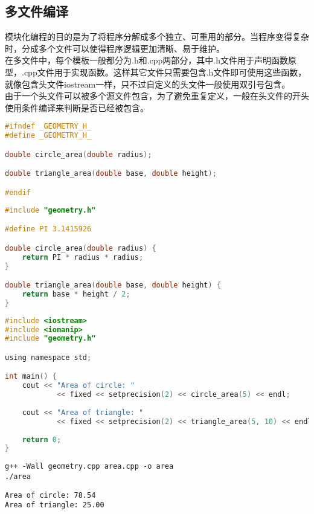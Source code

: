 \vspace{0.5cm}

\subsection{多文件编译}

模块化编程的目的是为了将程序分解成多个独立、可重用的部分。当程序变得复杂时，分成多个文件可以使得程序逻辑更加清晰、易于维护。\\

在多文件中，每个模板一般都分为.h和.cpp两部分，其中.h文件用于声明函数原型，.cpp文件用于实现函数。这样其它文件只需要包含.h文件即可使用这些函数，就像包含头文件iostream一样，只不过自定义的头文件一般使用双引号包含。\\

由于一个头文件可以被多个源文件包含，为了避免重复定义，一般在头文件的开头使用条件编译来判断是否已经被包含。\\


\begin{lstlisting}[language=C, title=geometry.h]
#ifndef _GEOMETRY_H_
#define _GEOMETRY_H_

double circle_area(double radius);

double triangle_area(double base, double height);

#endif
\end{lstlisting}

\begin{lstlisting}[language=C, title=geometry.cpp]
#include "geometry.h"

#define PI 3.1415926

double circle_area(double radius) {
    return PI * radius * radius;
}

double triangle_area(double base, double height) {
    return base * height / 2;
}
\end{lstlisting}

\begin{lstlisting}[language=C, title=area.cpp]
#include <iostream>
#include <iomanip>
#include "geometry.h"

using namespace std;

int main() {
    cout << "Area of circle: "
            << fixed << setprecision(2) << circle_area(5) << endl;
    
    cout << "Area of triangle: "
            << fixed << setprecision(2) << triangle_area(5, 10) << endl;
    
    return 0;
}
\end{lstlisting}

\vspace{-0.5cm}

\begin{lstlisting}
g++ -Wall geometry.cpp area.cpp -o area
./area
\end{lstlisting}

\begin{tcolorbox}
    \begin{verbatim}
Area of circle: 78.54
Area of triangle: 25.00
	\end{verbatim}
\end{tcolorbox}

\newpage